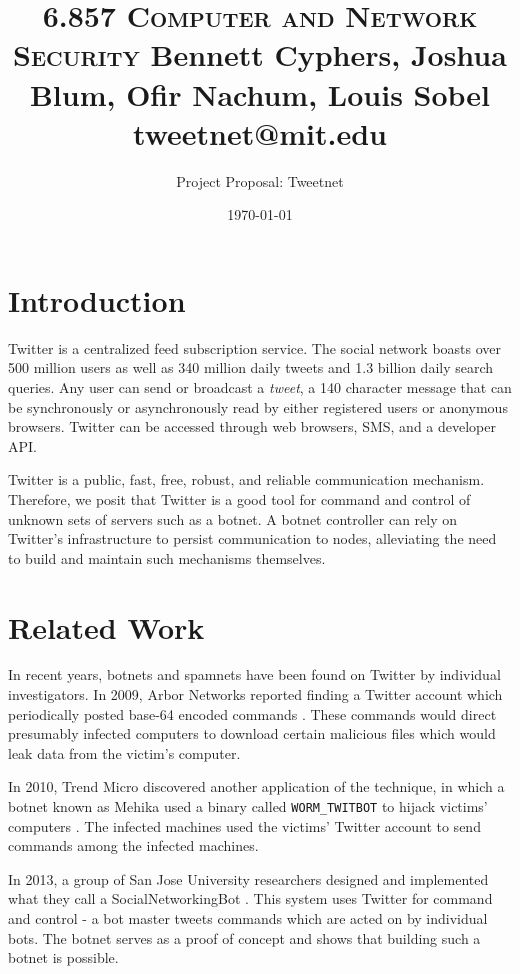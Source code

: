 \documentclass[paper=a4, fontsize=11pt]{scrartcl} %
\title{ 
\normalfont \normalsize 
\textsc{6.857 Computer and Network Security} %
\horrule{0.5pt} %
\large Bennett Cyphers, Joshua Blum, Ofir Nachum, Louis Sobel \\
{\normalsize tweetnet@mit.edu} %
\horrule{1pt} %
}
\author{Project Proposal: Tweetnet}
\date{\normalsize\today} %
\numberwithin{equation}{section} %
\numberwithin{figure}{section} %
\numberwithin{table}{section} %
\newcommand{\code}[1]{\texttt{#1}}
\begin{document}
\maketitle %
\section {Introduction}

Twitter is a centralized feed subscription service.
The social network boasts over 500 million users as well as 340 million daily tweets and 1.3 billion daily search queries.
Any user can send or broadcast a \emph{tweet}, a 140 character message that can be synchronously or
asynchronously read by either registered users or anonymous browsers.
Twitter can be accessed through web browsers, SMS, and a developer API.

Twitter is a public, fast, free, robust, and reliable communication mechanism.
Therefore, we posit that Twitter is a good tool for command and control of unknown sets of servers such as a botnet.
A botnet controller can rely on Twitter's infrastructure to persist communication to nodes,
alleviating the need to build and maintain such mechanisms themselves.

\section {Related Work}

In recent years, botnets and spamnets have been found on Twitter by individual investigators.
In 2009, Arbor Networks reported finding a Twitter account which periodically posted base-64 encoded commands \cite{arbor}.
These commands would direct presumably infected computers to download certain malicious files which would leak data from the victim's computer.

In 2010, Trend Micro discovered another application of the technique, in which a botnet
known as Mehika used a binary called \code{WORM\_TWITBOT} to hijack victims' computers \cite{trendmicro}.
The infected machines used the victims' Twitter account to send commands among the infected machines.

In 2013, a group of San Jose University researchers designed and implemented what they call a SocialNetworkingBot \cite{socialnetworking}.
This system uses Twitter for command and control - a bot master tweets commands which are acted on by individual bots.
The botnet serves as a proof of concept and shows that building such a botnet is possible.
\end{document}
